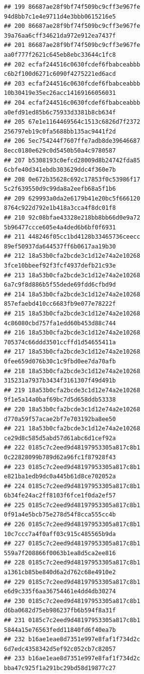 \documentclass[]{article}
\begin{document}
\begin{verbatim}
## 199 86687ae28f9bf74f509bc9cff3e967fe   94d8bb7c1e4e9711d4e3bbb0615216e5
## 200 86687ae28f9bf74f509bc9cff3e967fe   39a76aa6cff34621da972e912ea7437f
## 201 86687ae28f9bf74f509bc9cff3e967fe   aa0f777f2621c645eb8ebc33644c1fc8
## 202 ecfaf244516c0630fcdef6fbabceabbb   c6b2f100d6271c6090f4275221ed6acd
## 203 ecfaf244516c0630fcdef6fbabceabbb   10b30419e35ec26acc14169166056031
## 204 ecfaf244516c0630fcdef6fbabceabbb   a0efd91ed85b6c75933d3381b8cb634f
## 205 67e1e1164469564c1513c6826d7f2372   256797eb19c0fa5688bb135ac9441f2d
## 206 5ec754244f7607ffe7adb8de39646687   8ecc0180e629c0d5450b50a4c9780587
## 207 b5308193c0efcd28009d8b24742fda85   6cbfe40d341ebdb303629ddc4f360e7b
## 208 0e672b35628c692c17853f0c53986f17   5c2f639550d9c99da8a2eefb68a5f1b6
## 209 629993a0da2e6179b41e20bc5f666120   8764c922d792e1b418a3cca4f8dc01f8
## 210 92c08bfae43328e218bb8bb66d0e9a72   5b96477ccce605e4a4ded6b6bf0f6931
## 211 448246f05cc1bd4128b33465736ceecc   89ef50937da644537ff6b0617aa19b30
## 212 18a53b0cfa2bcde3c1d12e74a2e10268   3fce10bbeef92f3fcf4937defb21c93e
## 213 18a53b0cfa2bcde3c1d12e74a2e10268   6a7c9f8d886b5f55dede69fdd6cfbd9d
## 214 18a53b0cfa2bcde3c1d12e74a2e10268   857efaebd410cc6683fb9e077e78222f
## 215 18a53b0cfa2bcde3c1d12e74a2e10268   4c86080cbd757fa1edd60b453d88c744
## 216 18a53b0cfa2bcde3c1d12e74a2e10268   705374c66ddd3501ccffd1d54655411a
## 217 18a53b0cfa2bcde3c1d12e74a2e10268   0fee659d076b30c1c9fbd0ee7da70afb
## 218 18a53b0cfa2bcde3c1d12e74a2e10268   315231a7937b3434f3161307f49d491b
## 219 18a53b0cfa2bcde3c1d12e74a2e10268   9f1e5a14a0baf69bc7d5d658ddb53338
## 220 18a53b0cfa2bcde3c1d12e74a2e10268   d770a59f57acae2bf7e703192ba8ee50
## 221 18a53b0cfa2bcde3c1d12e74a2e10268   ce29d8c585d5abd57d61abc6d1cef92a
## 222 0185c7c2eed9d48197953305a817c8b1   0c22828099b789d62a96fc1f87928f43
## 223 0185c7c2eed9d48197953305a817c8b1   e821ba1edb9dc0a445b61d8ce702052a
## 224 0185c7c2eed9d48197953305a817c8b1   6b34fe24ac2ff8103f6fce1f0da2ef57
## 225 0185c7c2eed9d48197953305a817c8b1   0f91a4e5bcb75e278d54f8cca555cc4b
## 226 0185c7c2eed9d48197953305a817c8b1   10c7ccc7a4f0aff03c915c485565b9da
## 227 0185c7c2eed9d48197953305a817c8b1   559a7f208866f0063b1ea8d5ca2ee816
## 228 0185c7c2eed9d48197953305a817c8b1   a1361cb85be840d6a2d762c68e4910e2
## 229 0185c7c2eed9d48197953305a817c8b1   e6d9c335f6aa36754461e4dd4db30274
## 230 0185c7c2eed9d48197953305a817c8b1   d6ba0682d75eb986237fb6b594f8a31f
## 231 0185c7c2eed9d48197953305a817c8b1   5844a15e76563fedd11840fd6f40ea7b
## 232 b16ae1eae8d7351e997e8faf1f734d2c   6d7edc4358342d5ef92c052cb7c82057
## 233 b16ae1eae8d7351e997e8faf1f734d2c   bba47c925f1a291bc29bd58d19877c27

\end{verbatim}
\end{document}
